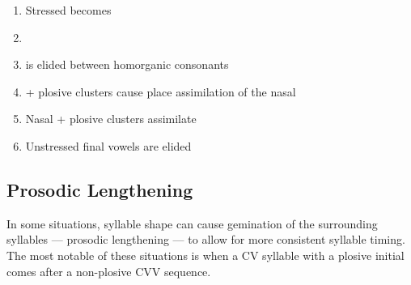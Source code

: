 \begin{enumerate}
  \item {
    Stressed  becomes 

    }
  \item {}
  \item {
     is elided between homorganic consonants

    }
    \item {
       + plosive clusters cause place assimilation of the nasal

  }
    \item {
      Nasal + plosive clusters assimilate

  }

  \item {
      Unstressed final vowels are elided

  }


\end{enumerate}

\subsection{Prosodic Lengthening}\label{sec:phono-allo-lengthening}
In some situations, syllable shape can cause gemination of the surrounding syllables --- prosodic lengthening --- to allow for more consistent syllable timing. The most notable of these situations is when a CV syllable with a plosive initial comes after a non-plosive CVV sequence\footnotemark.


